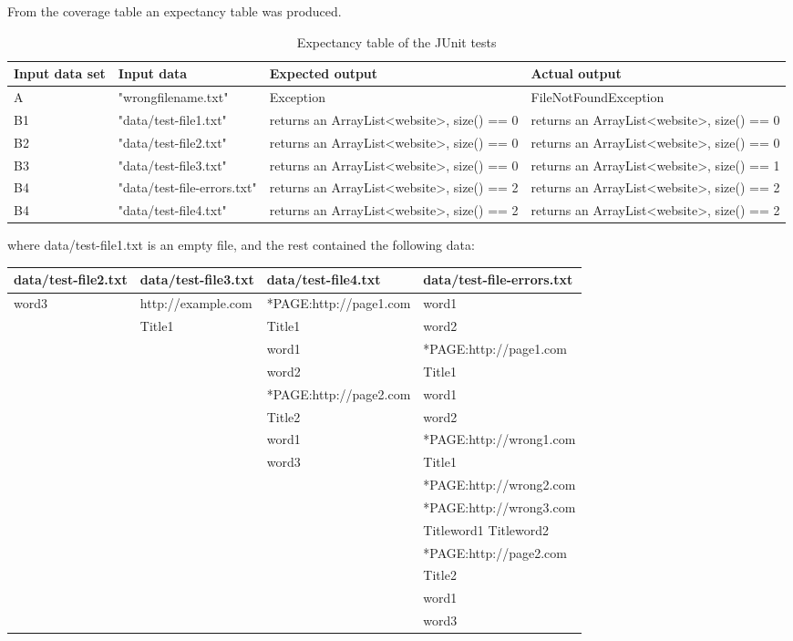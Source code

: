 From the coverage table an expectancy table was produced.

\begin{table}[!h]
\caption{Expectancy table of the JUnit tests}
\begin{tabular}{|l|p{85pt}|p{100pt}|p{100pt}|}
\hline
\textbf{Input data set} & \textbf{Input data} & \textbf{Expected output} & \textbf{Actual output} \\ \hline
A & "wrongfilename.txt" & Exception & FileNotFoundException \\ \hline
B1 & "data/test-file1.txt" & returns an ArrayList<website>, size() == 0 & returns an ArrayList<website>, size() == 0 \\ \hline
B2 & "data/test-file2.txt" & returns an ArrayList<website>, size() == 0 & returns an ArrayList<website>, size() == 0 \\ \hline
B3 & "data/test-file3.txt" & returns an ArrayList<website>, size() == 0 & returns an ArrayList<website>, size() == 1 \\ \hline
B4 & "data/test-file-errors.txt" & returns an ArrayList<website>, size() == 2 & returns an ArrayList<website>, size() == 2 \\ \hline
B4 & "data/test-file4.txt" & returns an ArrayList<website>, size() == 2 & returns an ArrayList<website>, size() == 2 \\ \hline
\end{tabular}
\label{FH:resuts}
\end{table}

where data/test-file1.txt is an empty file, and the rest contained the following data:

\begin{table}[!h]
\begin{tabular}{|l|l|l|l|}
\hline
\textbf{data/test-file2.txt} & \textbf{data/test-file3.txt} & \textbf{data/test-file4.txt} & \textbf{data/test-file-errors.txt} \\ \hline
word3 & http://example.com & *PAGE:http://page1.com &  word1 \\
& Title1 & Title1 & word2 \\
&  & word1 & *PAGE:http://page1.com \\
&  & word2 & Title1 \\
&  & *PAGE:http://page2.com & word1 \\
&  & Title2 & word2 \\
&  & word1 &  *PAGE:http://wrong1.com \\
&  & word3 & Title1 \\
&  &  & *PAGE:http://wrong2.com \\
&  &  & *PAGE:http://wrong3.com \\
&  &  & Titleword1 Titleword2 \\
&  &  & *PAGE:http://page2.com \\
&  &  & Title2 \\
&  &  & word1 \\
&  &  & word3
\end{tabular}
\end{table}

